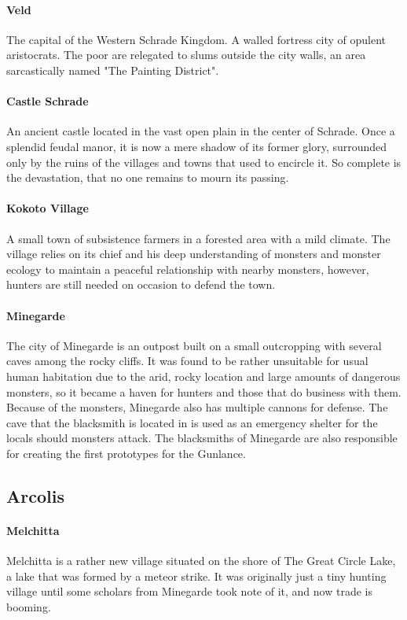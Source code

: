 \paragraph{Veld} The capital of the Western Schrade Kingdom. A walled fortress city of opulent aristocrats. The poor are relegated to slums outside the city walls, an area sarcastically named "The Painting District".

\paragraph{Castle Schrade} An ancient castle located in the vast open plain in the center of Schrade. Once a splendid feudal manor, it is now a mere shadow of its former glory, surrounded only by the ruins of the villages and towns that used to encircle it. So complete is the devastation, that no one remains to mourn its passing.

\paragraph{Kokoto Village} A small town of subsistence farmers in a forested area with a mild climate. The village relies on its chief and his deep understanding of monsters and monster ecology to maintain a peaceful relationship with nearby monsters, however, hunters are still needed on occasion to defend the town.

\paragraph{Minegarde} The city of Minegarde is an outpost built on a small outcropping with several caves among the rocky cliffs.  It was found to be rather unsuitable for usual human habitation due to the arid, rocky location and large amounts of dangerous monsters, so it became a haven for hunters and those that do business with them.  Because of the monsters, Minegarde also has multiple cannons for defense.  The cave that the blacksmith is located in is used as an emergency shelter for the locals should monsters attack.  The blacksmiths of Minegarde are also responsible for creating the first prototypes for the Gunlance.

\subsection*{Arcolis}
\paragraph{Melchitta} Melchitta is a rather new village situated on the shore of The Great Circle Lake, a lake that was formed by a meteor strike. It was originally just a tiny hunting village until some scholars from Minegarde took note of it, and now trade is booming.

